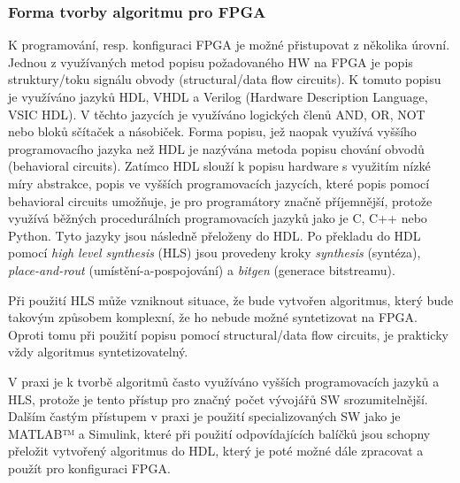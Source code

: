 \documentclass[a4paper, twoside, 11pt]{article}
\begin{document}
		\subsubsection{Forma tvorby algoritmu pro FPGA}\label{subsubsec:forma-tvorby-algoritmu-pro-fpga}
		K programování, resp. konfiguraci FPGA je možné přistupovat z několika úrovní. Jednou z využívaných metod popisu požadovaného HW na FPGA je popis struktury/toku signálu obvody (structural/data flow circuits). K tomuto popisu je využíváno jazyků HDL, VHDL a Verilog (Hardware Description Language, VSIC HDL). V těchto jazycích je využíváno logických členů AND, OR, NOT nebo bloků sčítaček a násobiček. Forma popisu, jež naopak využívá vyššího programovacího jazyka než HDL je nazývána metoda popisu chování obvodů (behavioral circuits). Zatímco HDL slouží k popisu hardware s využitím nízké míry abstrakce, popis ve vyšších programovacích jazycích, které popis pomocí behavioral circuits umožňuje, je pro programátory značně příjemnější, protože využívá běžných procedurálních programovacích jazyků jako je C, C++ nebo Python. Tyto jazyky jsou následně přeloženy do HDL. Po překladu do HDL pomocí \textit{high level synthesis} (HLS) jsou provedeny kroky \textit{synthesis} (syntéza), \textit{place-and-rout} (umístění-a-pospojování) a \textit{bitgen} (generace bitstreamu). \cite{Sass2010}\par
		Při použití HLS může vzniknout situace, že bude vytvořen algoritmus, který bude takovým způsobem komplexní, že ho nebude možné syntetizovat na FPGA. Oproti tomu při použití popisu pomocí structural/data flow circuits, je prakticky vždy algoritmus syntetizovatelný. \cite{Sass2010}\par
		V praxi je k tvorbě algoritmů často využíváno vyšších programovacích jazyků a HLS, protože je tento přístup pro značný počet vývojářů SW srozumitelnější. Dalším častým přístupem v praxi je použití specializovaných SW jako je MATLAB™️ a Simulink, které při použití odpovídajících balíčků jsou schopny přeložit vytvořený algoritmus do HDL, který je poté možné dále zpracovat a použít pro konfiguraci FPGA.
\end{document}
